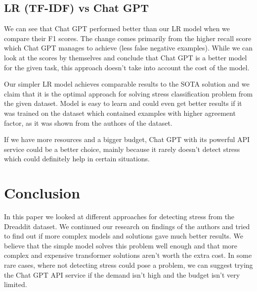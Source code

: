 \documentclass[10pt, a4paper]{article}
\begin{document}
\subsection{LR (TF-IDF) vs Chat GPT}
We can see that Chat GPT performed better than our LR model when we compare their F1 scores.
The change comes primarily from the higher recall score which Chat GPT manages to achieve (less false negative examples).
While we can look at the scores by themselves and conclude that Chat GPT is a better model for the given task, this approach doesn't take into account the cost of the model.

Our simpler LR model achieves comparable results to the SOTA solution and we claim that it is the optimal approach for solving stress classification problem from the given dataset.
Model is easy to learn and could even get better results if it was trained on the dataset which contained examples with higher agreement factor, as it was shown from the authors of the dataset.

If we have more resources and a bigger budget, Chat GPT with its powerful API service could be a better choice, mainly because it rarely doesn't detect stress which could definitely help in certain situations.
\section{Conclusion}

In this paper we looked at different approaches for detecting stress from the Dreaddit dataset.
We continued our research on findings of the authors and tried to find out if more complex models and solutions gave much better results.
\hfill \break
\hfill \break
We believe that the simple model solves this problem well enough and that more complex and expensive transformer solutions aren't worth the extra cost.
In some rare cases, where not detecting stress could pose a problem, we can suggest trying the Chat GPT API service if the demand isn't high and the budget isn't very limited.



\end{document}
